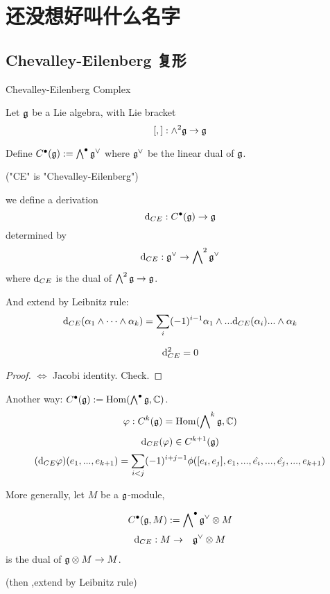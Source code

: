 
\chapter{还没想好叫什么名字}

\section{Chevalley-Eilenberg 复形}

Chevalley-Eilenberg Complex

Let $\mathfrak{g}$ be a Lie algebra, with Lie bracket
$$[,]:\wedge^2\mathfrak{g}\to\mathfrak{g}$$

Define $C^{\bullet}(\mathfrak{g}):=\bigwedge\nolimits^{\bullet}\mathfrak{g}^\vee$
where $\mathfrak{g}^\vee$ be the linear dual of $\mathfrak{g}$.

("CE" is "Chevalley-Eilenberg")

we define a derivation
$$\mathrm{d}_{CE}:C^{\bullet}(\mathfrak{g})\to\mathfrak{g}$$
determined by
$$\mathrm{d}_{CE}:\mathfrak{g}^\vee\to\bigwedge\nolimits^{2}\mathfrak{g}^\vee$$
where $\mathrm{d}_{CE}$ is the dual of $\bigwedge\nolimits^{2}\mathfrak{g}\to\mathfrak{g}$.

And extend by Leibnitz rule:
$$\mathrm{d}_{CE}(\alpha_1\wedge\cdots\wedge\alpha_k)
=
\sum_i(-1)^{i-1}
\alpha_1\wedge...\mathrm{d}_{CE}(\alpha_i)...\wedge\alpha_k
$$

\begin{prop}
$$\mathrm{d}_{CE}^2=0$$
\end{prop}
\begin{proof}
$\iff$ Jacobi identity. Check.
\end{proof}

Another way: $C^{\bullet}(\mathfrak{g}):=\operatorname{Hom}(\bigwedge\nolimits^{\bullet}\mathfrak{g},\mathbb{C})$.
$$\varphi:C^k(\mathfrak{g})=\operatorname{Hom}(\bigwedge\nolimits^{k}\mathfrak{g},\mathbb{C})$$
$$\mathrm{d}_{CE}(\varphi)\in C^{k+1}(\mathfrak{g})$$
$$(\mathrm{d}_{CE}\varphi)(e_1,...,e_{k+1})=
   \sum_{i<j}
     (-1)^{i+j-1}
     \phi([e_i,e_j],e_1,...,\hat{e_i},...,\hat{e_j},...,e_{k+1})
$$

More generally, let $M$ be a $\mathfrak{g}$-module,
\begin{definition}
$$C^{\bullet}(\mathfrak{g},M):=\bigwedge\nolimits^{\bullet}\mathfrak{g}^\vee\otimes M$$
\begin{eqnarray*}
\mathrm{d}_{CE}:M&\to&\mathfrak{g}^\vee\otimes M\\
\end{eqnarray*}
is the dual of $\mathfrak{g}\otimes M\to M$.

(then ,extend by Leibnitz rule)
\end{definition}

